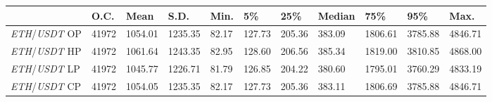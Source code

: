 \begin{tabular}{lllllllllll}
\toprule
 & \textbf{O.C.} & \textbf{Mean} & \textbf{S.D.} & \textbf{Min.} & \textbf{5\%} & \textbf{25\%} & \textbf{Median} & \textbf{75\%} & \textbf{95\%} & \textbf{Max.} \\
\midrule
\emph{ETH}/\emph{USDT} OP & 41972 & 1054.01 & 1235.35 & 82.17 & 127.73 & 205.36 & 383.09 & 1806.61 & 3785.88 & 4846.71 \\
\emph{ETH}/\emph{USDT} HP & 41972 & 1061.64 & 1243.35 & 82.95 & 128.60 & 206.56 & 385.34 & 1819.00 & 3810.85 & 4868.00 \\
\emph{ETH}/\emph{USDT} LP & 41972 & 1045.77 & 1226.71 & 81.79 & 126.85 & 204.22 & 380.60 & 1795.01 & 3760.29 & 4833.19 \\
\emph{ETH}/\emph{USDT} CP & 41972 & 1054.05 & 1235.35 & 82.17 & 127.73 & 205.36 & 383.11 & 1806.69 & 3785.88 & 4846.71 \\
\bottomrule
\end{tabular}
